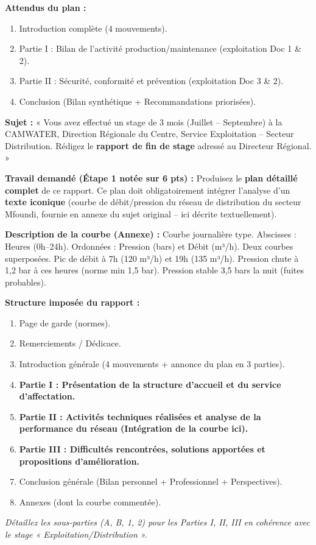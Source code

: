 \documentclass[11pt]{article}
\begin{document}
\begin{exercice}
\textbf{Attendus du plan :}
\begin{enumerate}
    \item Introduction complète (4 mouvements).
    \item Partie I : Bilan de l'activité production/maintenance (exploitation Doc 1 \& 2).
    \item Partie II : Sécurité, conformité et prévention (exploitation Doc 3 \& 2).
    \item Conclusion (Bilan synthétique + Recommandations priorisées).
\end{enumerate}
\end{exercice}

\begin{exercice}
\textbf{Sujet :} « Vous avez effectué un stage de 3 mois (Juillet -- Septembre) à la CAMWATER, Direction Régionale du Centre, Service Exploitation -- Secteur Distribution. Rédigez le \textbf{rapport de fin de stage} adressé au Directeur Régional. »

\textbf{Travail demandé (Étape 1 notée sur 6 pts) :} Produisez le \textbf{plan détaillé complet} de ce rapport. Ce plan doit obligatoirement intégrer l'analyse d'un \textbf{texte iconique} (courbe de débit/pression du réseau de distribution du secteur Mfoundi, fournie en annexe du sujet original -- ici décrite textuellement).

\textbf{Description de la courbe (Annexe) :} Courbe journalière type. Abscisses : Heures (0h--24h). Ordonnées : Pression (bars) et Débit (m³/h). Deux courbes superposées. Pic de débit à 7h (120 m³/h) et 19h (135 m³/h). Pression chute à 1,2 bar à ces heures (norme min 1,5 bar). Pression stable 3,5 bars la nuit (fuites probables).

\textbf{Structure imposée du rapport :}
\begin{enumerate}
    \item Page de garde (normes).
    \item Remerciements / Dédicace.
    \item Introduction générale (4 mouvements + annonce du plan en 3 parties).
    \item \textbf{Partie I : Présentation de la structure d'accueil et du service d'affectation.}
    \item \textbf{Partie II : Activités techniques réalisées et analyse de la performance du réseau (Intégration de la courbe ici).}
    \item \textbf{Partie III : Difficultés rencontrées, solutions apportées et propositions d'amélioration.}
    \item Conclusion générale (Bilan personnel + Professionnel + Perspectives).
    \item Annexes (dont la courbe commentée).
\end{enumerate}
\textit{Détaillez les sous-parties (A, B, 1, 2) pour les Parties I, II, III en cohérence avec le stage « Exploitation/Distribution ».}
\end{exercice}
\end{document}

